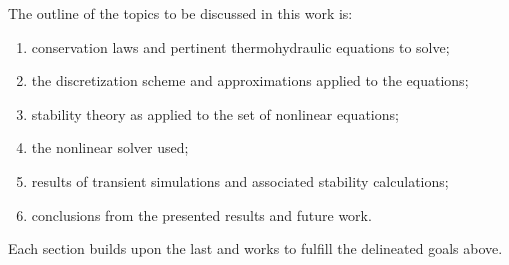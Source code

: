 \documentclass[12pt]{../UWMadThesis}
\begin{document}
The outline of the topics to be discussed in this work is:
\begin{enumerate}[topsep=0pt,parsep=0pt,itemsep=2pt]
    \item{conservation laws and pertinent thermohydraulic equations to solve;}
    \item{the discretization scheme and approximations applied to the equations;}
    \item{stability theory as applied to the set of nonlinear equations;}
    \item{the nonlinear solver used;}
    \item{results of transient simulations and associated stability calculations;}
    \item{conclusions from the presented results and future work.}
\end{enumerate}
Each section builds upon the last and works to fulfill the delineated goals above.






 
 \fi
\end{document}
